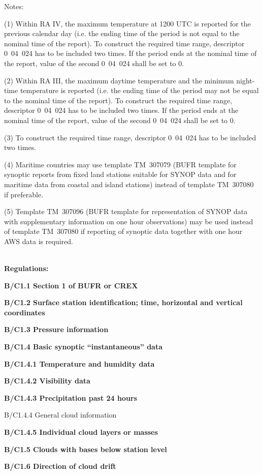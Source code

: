 Notes:

(1) Within RA IV, the maximum temperature at 1200 UTC is reported for the previous calendar day (i.e. the ending time of the period is not equal to the nominal time of the report). To construct the required time range, descriptor 0~04~024 has to be included two times. If the period ends at the nominal time of the report, value of the second 0~04~024 shall be set to 0.

(2) Within RA III, the maximum daytime temperature and the minimum night-time temperature is reported (i.e. the ending time of the period may not be equal to the nominal time of the report). To construct the required time range, descriptor 0~04~024 has to be included two times. If the period ends at the nominal time of the report, value of the second 0~04~024 shall be set to 0.

(3) To construct the required time range, descriptor 0~04~024 has to be included two times.

(4) Maritime countries may use template TM~307079 (BUFR template for synoptic reports from fixed land stations suitable for SYNOP data and for maritime data from coastal and island stations) instead of template TM~307080 if preferable.

(5) Template TM~307096 (BUFR template for representation of SYNOP data with supplementary information on one hour observations) may be used instead of template TM~307080 if reporting of synoptic data together with one hour AWS data is required.

\textbf{\\
Regulations:}

\textbf{B/C1.1 Section 1 of BUFR or CREX}

\textbf{B/C1.2 Surface station identification; time, horizontal and vertical coordinates}

\textbf{B/C1.3 Pressure information}

\textbf{B/C1.4 Basic synoptic ``instantaneous'' data}

\textbf{B/C1.4.1 Temperature and humidity data}

\textbf{B/C1.4.2 Visibility data}

\textbf{B/C1.4.3 Precipitation past 24 hours}

B/C1.4.4 General cloud information

\textbf{B/C1.4.5 Individual cloud layers or masses}

\textbf{B/C1.5 Clouds with bases below station level}

\textbf{B/C1.6 Direction of cloud drift}

